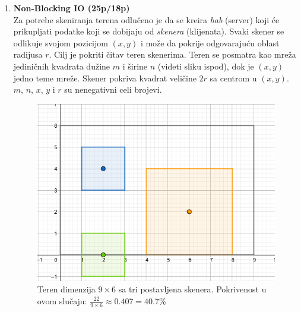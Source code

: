 \documentclass[]{article}
\begin{document}
\begin{enumerate}

\item \textbf{Non-Blocking IO (25p/18p)}
\\Za potrebe skeniranja terena odlu\v{c}eno je da se kreira \emph{hab} (server) koji \'c{}e prikupljati podatke koji se dobijaju od \emph{skenera} (klijenata). Svaki skener se odlikuje svojom pozicijom $(x,y)$ i mo\v{z}e da pokrije odgovaraju\'c{}u oblast radijusa $r$. Cilj je pokriti \v{c}itav teren skenerima. Teren se posmatra kao mre\v{z}a jedini\v{c}nih kvadrata du\v{z}ine $m$ i \v{s}irine $n$ (videti sliku ispod), dok je $(x,y)$ jedno teme mre\v{z}e. Skener pokriva kvadrat veli\v{c}ine $2r$ sa centrom u $(x,y)$. $m$, $n$, $x$, $y$ i $r$ su nenegativni celi brojevi.

\begin{figure}[h!]
  \centering
  \includegraphics[scale=0.6]{images/terrain.png}
  \caption{Teren dimenzija $9 \times 6$ sa tri postavljena skenera. Pokrivenost u ovom slu\v{c}aju: $\frac{22}{9 \times 6} \approx 0.407 = 40.7\%$}
\end{figure}


\end{enumerate}
\end{document}

